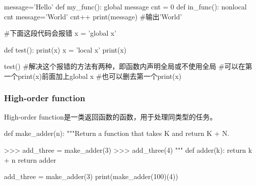       \begin{codeblock}[language=python, caption={local and global}]
        message='Hello'
        def my_func():
          global message
          cnt = 0
          def in_func():
            nonlocal cnt
          message='World'
          cnt++
        print(message) #输出'World'

        #下面这段代码会报错
        x = 'global x'

        def test():
          print(x)
          x = 'local x'
          print(x)
        
        test()
        #解决这个报错的方法有两种，即函数内声明全局或不使用全局
        #可以在第一个print(x)前面加上global x
        #也可以删去第一个print(x)
      \end{codeblock}

    \subsubsection{High-order function}
      High-order function是一类返回函数的函数，用于处理同类型的任务。
      \begin{codeblock}[language=python, caption={High-order function}]
        def make_adder(n):
          """Return a function that takes K and return K + N.

          >>> add_three = make_adder(3)
          >>> add_three(4)
          """
          def adder(k):
            return k + n
          return adder

        add_three = make_adder(3)
        print(make_adder(100)(4))
      \end{codeblock}

